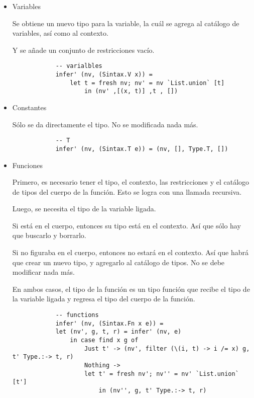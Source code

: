 \documentclass{article}
\begin{document}
    \begin{itemize}
        \item Variables

        Se obtiene un nuevo tipo para la variable, la cuál se agrega al catálogo
        de variables, así como al contexto. 
        
        Y se añade un conjunto de restricciones vacío.

        \begin{verbatim}
            -- varialbles
            infer' (nv, (Sintax.V x)) = 
                let t = fresh nv; nv' = nv `List.union` [t]
                    in (nv' ,[(x, t)] ,t , [])
        \end{verbatim}

        \item Constantes

        Sólo se da directamente el tipo. No se modificada nada más.

        \begin{verbatim}
            -- T
            infer' (nv, (Sintax.T e)) = (nv, [], Type.T, [])
        \end{verbatim}

        \item Funciones

        Primero, es necesario tener el tipo, el contexto, las restricciones y el
        catálogo de tipos del cuerpo de la función. Esto se logra con una
        llamada recursiva.

        Luego, se necesita el tipo de la variable ligada.
        
        Si está en el cuerpo, entonces su tipo está en el contexto. Así que sólo
        hay que buscarlo y borrarlo. 
        
        Si no figuraba en el cuerpo, entonces no estará en el contexto. Así que
        habrá que crear un nuevo tipo, y agregarlo al catálogo de tipos. No se 
        debe modificar nada más.

        En ambos casos, el tipo de la función es un tipo función que recibe el
        tipo de la variable ligada y regresa el tipo del cuerpo de la función.

        \begin{verbatim}
            -- functions
            infer' (nv, (Sintax.Fn x e)) = 
            let (nv', g, t, r) = infer' (nv, e)
                in case find x g of
                    Just t' -> (nv', filter (\(i, t) -> i /= x) g, t' Type.:-> t, r)
                    Nothing -> 
                    let t' = fresh nv'; nv'' = nv' `List.union` [t']
                        in (nv'', g, t' Type.:-> t, r)
        \end{verbatim}


\end{itemize}
\end{document}
